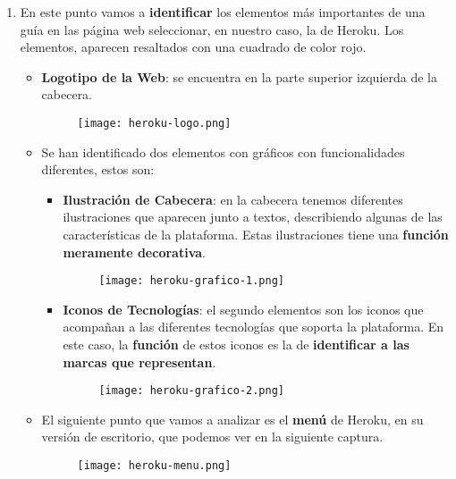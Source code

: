 \begin{enumerate}[label=\alph*)]
    \item En este punto vamos a \textbf{identificar} los elementos más importantes de una guía en las página web seleccionar, en nuestro caso, la de Heroku. Los elementos, aparecen resaltados con una cuadrado de color rojo.

    \begin{itemize}
        \item \textbf{Logotipo de la Web}: se encuentra en la parte superior izquierda de la cabecera.

        \begin{figure}[H]
            \centering
            \texttt{[image: heroku-logo.png]}
        \end{figure}

        \item Se han identificado dos elementos con gráficos con funcionalidades diferentes, estos son:
        \begin{itemize}
            \item \textbf{Ilustración de Cabecera}: en la cabecera tenemos diferentes ilustraciones que aparecen junto a textos, describiendo algunas de las características de la plataforma. Estas ilustraciones tiene una \textbf{función meramente decorativa}.

            \begin{figure}[H]
                \centering
                \texttt{[image: heroku-grafico-1.png]}
            \end{figure}

            \item \textbf{Iconos de Tecnologías}: el segundo elementos son los iconos que acompañan a las diferentes tecnologías que soporta la plataforma. En este caso, la \textbf{función} de estos iconos es la de \textbf{identificar a las marcas que representan}.

            \begin{figure}[H]
                \centering
                \texttt{[image: heroku-grafico-2.png]}
            \end{figure}
        \end{itemize}

        \item El siguiente punto que vamos a analizar es el \textbf{menú} de Heroku, en su versión de escritorio, que podemos ver en la siguiente captura.

        \begin{figure}[H]
            \centering
            \texttt{[image: heroku-menu.png]}
        \end{figure}


\end{itemize}
\end{enumerate}
